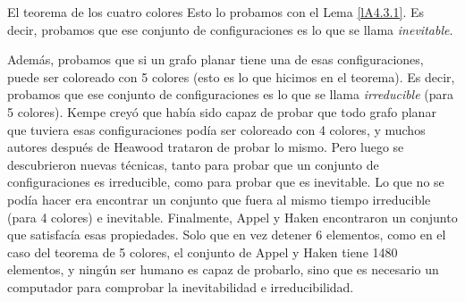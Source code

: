 \documentclass[11pt,spanish,makeidx]{amsbook}
\theoremstyle{definition}
\theoremstyle{remark}
\begin{document}
\begin{section}{El teorema de los cuatro colores}
Esto lo probamos con el Lema \ref{lA4.3.1}. Es decir, probamos que
ese conjunto de configuraciones es lo que se llama {\it
inevitable}.

Además, probamos que si un grafo planar tiene una de esas
configuraciones, puede ser coloreado con 5 colores (esto es lo que
hicimos en el teorema). Es decir, probamos que ese conjunto de
configuraciones es lo que se llama {\it irreducible} (para 5
colores). Kempe creyó que había sido capaz de probar que todo
grafo planar que tuviera esas configuraciones podía ser coloreado
con 4 colores, y muchos autores después de Heawood trataron de
probar lo mismo. Pero luego se descubrieron nuevas técnicas, tanto
para probar que un conjunto de configuraciones es irreducible,
como para probar que es inevitable. Lo que no se podía hacer era
encontrar un conjunto que fuera al mismo tiempo irreducible (para
4 colores) e inevitable. Finalmente, Appel y Haken encontraron un
conjunto que satisfacía esas propiedades. Solo que en vez detener
6 elementos, como en el caso del teorema de 5 colores, el conjunto
de Appel y Haken tiene 1480 elementos, y ningún ser humano es
capaz de probarlo, sino que es necesario un computador para
comprobar la inevitabilidad e irreducibilidad.

\end{section}

\printindex
\end{document}
